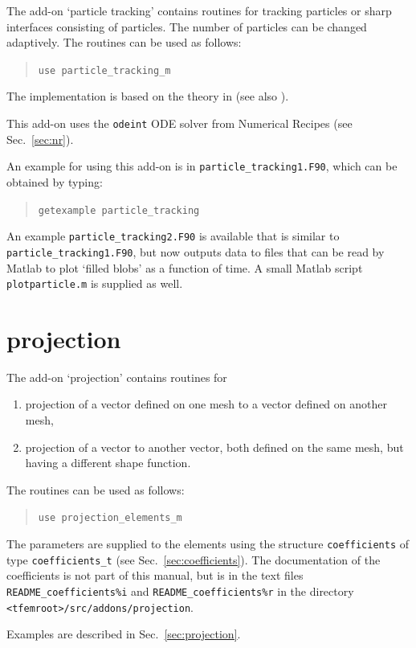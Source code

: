 The add-on `particle tracking' contains routines for tracking particles or
sharp interfaces consisting of particles. The number of particles can be
changed adaptively. The routines can be used as follows:
\begin{quote}
   \texttt{use particle\_tracking\_m}
\end{quote}
The implementation is based on the theory in \cite{Galaktionov00} (see also
\cite{Hulsen05a}).

This add-on uses the \texttt{odeint} ODE solver from Numerical Recipes (see Sec.~\ref{sec:nr}).

An example for using this add-on is in
\texttt{particle\_tracking1.F90},
which can be obtained by typing:
\begin{quote}
   \texttt{getexample particle\_tracking}
\end{quote}
An example \texttt{particle\_tracking2.F90} is available that is similar to \texttt{particle\_tracking1.F90}, but
now outputs data to files that can be read by Matlab to plot `filled blobs' as a function of time. A small Matlab script \texttt{plotparticle.m} is supplied as well.

\section{projection}
\label{sec:projection_addon}

The add-on `projection' contains routines for
\begin{enumerate}
   \item projection of a vector defined on one mesh to a vector defined on
         another mesh,
   \item projection of a vector to another vector, both defined on the same
         mesh, but having a different shape function.
\end{enumerate}

The routines can be used as follows:
\begin{quote}
   \texttt{use projection\_elements\_m}
\end{quote}

The parameters are
supplied to the elements using the structure \texttt{coefficients} of type
\texttt{coefficients\_t} (see Sec.~\ref{sec:coefficients}). The documentation
of the coefficients is not part of this manual, but is in the text files
\texttt{README\_coefficients\%i} and
\texttt{README\_coefficients\%r} in the directory
\texttt{<tfemroot>/src/addons/projection}.

Examples are described in Sec.~\ref{sec:projection}.

